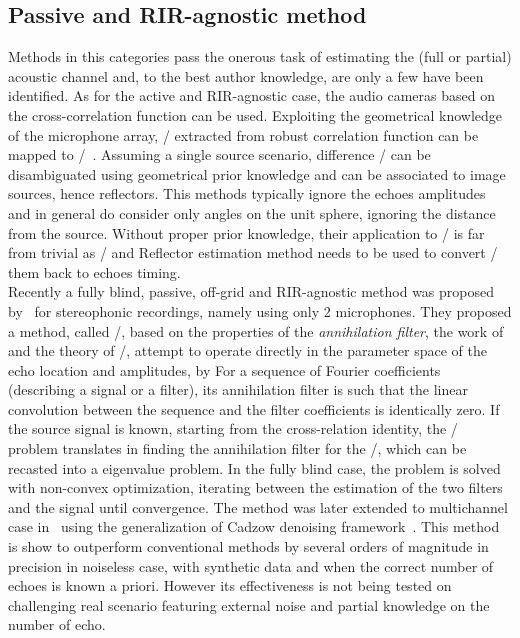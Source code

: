 \subsection{Passive and RIR-agnostic method}
Methods in this categories pass the onerous task of estimating the (full or partial) acoustic channel and, to the best author knowledge, are only a few have been identified.
As for the active and RIR-agnostic case, the audio cameras based on the cross-correlation function can be used.
Exploiting the geometrical knowledge of the microphone array, \TDOAs/ extracted from robust correlation function can be mapped to \DOAs/~.
Assuming a single source scenario, difference \DOAs/ can be disambiguated using geometrical prior knowledge and can be associated to image sources, hence reflectors.
This methods typically ignore the echoes amplitudes and in general do consider only angles on the unit sphere, ignoring the distance from the source.
Without proper prior knowledge, their application to \AER/ is far from trivial as \RooGE/ and Reflector estimation method needs to be used to convert \DOAs/ them back to echoes timing.
\\Recently a fully blind, passive, off-grid and RIR-agnostic method was proposed by~\citeauthor{tukuljac2018mulan} for stereophonic recordings, namely using only 2 microphones.
They proposed a method, called \MULAN/, based on the properties of the \textit{annihilation filter}, the work of~ and the theory of \FRI/, attempt to operate directly in the parameter space of the echo location and amplitudes, by
For a sequence of Fourier coefficients (describing a signal or a filter), its annihilation filter is such that the linear convolution between the sequence and the filter coefficients is identically zero.
If the source signal is known, starting from the cross-relation identity, the \AER/ problem translates in finding the annihilation filter for the \RIRs/, which can be recasted into a eigenvalue problem.
In the fully blind case, the problem is solved with non-convex optimization, iterating between the estimation of the two filters and the signal until convergence.
The method was later extended to multichannel case in~ using the generalization of Cadzow denoising framework~.
This method is show to outperform conventional methods by several orders of magnitude in precision in noiseless case, with synthetic data and when the correct number of echoes is known a priori.
However its effectiveness is not being tested on challenging real scenario featuring external noise and partial knowledge on the number of echo.


